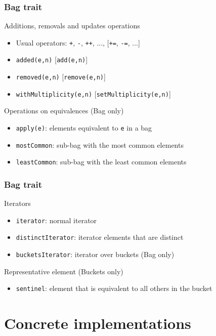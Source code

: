 \documentclass{beamer}
\begin{document}
\begin{frame}[fragile]
	\frametitle{Bag trait}
	\begin{block}{Additions, removals and updates operations}
		\begin{itemize}
			\item Usual operators: \texttt{+}, \texttt{-}, \texttt{++}, ..., [\texttt{+=}, \texttt{-=}, ...]
			\item \texttt{added(e,n)} [\texttt{add(e,n)}]
			\item \texttt{removed(e,n)} [\texttt{remove(e,n)}]
			\item \texttt{withMultiplicity(e,n)} [\texttt{setMultiplicity(e,n)}]
		\end{itemize}
	\end{block}
	\begin{block}{Operations on equivalences (Bag only)}
		\begin{itemize}
			\item \texttt{apply(e)}: elements equivalent to \texttt{e} in a bag
			\item \texttt{mostCommon}: sub-bag with the most common elements
			\item \texttt{leastCommon}: sub-bag with the least common elements 
		\end{itemize}
	\end{block}
\end{frame}

\begin{frame}[fragile]
	\frametitle{Bag trait}
	\begin{block}{Iterators}
		\begin{itemize}
			\item \texttt{iterator}: normal iterator
			\item \texttt{distinctIterator}: iterator elements that are distinct
			\item \texttt{bucketsIterator}: iterator over buckets (Bag only)
		\end{itemize}
	\end{block}	
	\begin{block}{Representative element (Buckets only)}
		\begin{itemize}
			\item \texttt{sentinel}: element that is equivalent to all others in the bucket
		\end{itemize}
	\end{block}
\end{frame}


\section{Concrete implementations} 
\end{document}
